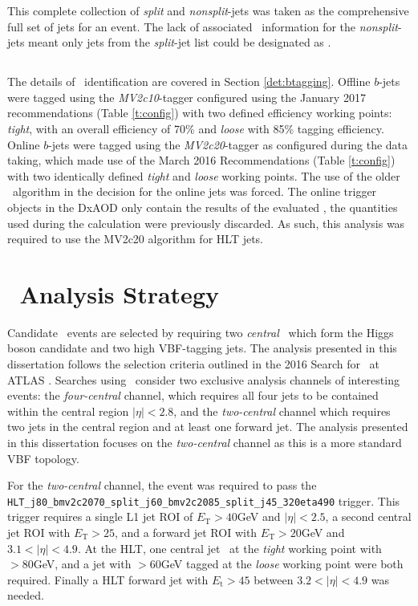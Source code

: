 		This complete collection of \textit{split} and \textit{nonsplit}-jets was taken as the comprehensive full set of jets for an event. The lack of associated \btag\ information for the \textit{nonsplit}-jets meant only jets from the \textit{split}-jet list could be designated as \bjets.

		\subsection{\bjets}

		The details of \bjet\ identification are covered in Section \ref{det:btagging}. Offline $b$-jets were tagged using the \textit{MV2c10}-tagger configured using the January 2017 recommendations (Table \ref{t:config}) with two defined efficiency working points: \textit{tight}, with an overall efficiency of 70\% and \textit{loose} with 85\% tagging efficiency. Online $b$-jets were tagged using the \textit{MV2c20}-tagger as configured during the data taking, which made use of the March 2016 Recommendations (Table \ref{t:config}) with two identically defined \textit{tight} and \textit{loose} working points. The use of the older \btagging\ algorithm in the decision for the online jets was forced. The online trigger objects in the DxAOD only contain the results of the evaluated \btag, the quantities used during the calculation were previously discarded. As such, this analysis was required to use the MV2c20 algorithm for HLT jets.


	\section{\VBFHBB\, Analysis Strategy}


	\label{es:as}
		Candidate \VBFHBB\, events are selected by requiring two \textit{central} \bjets\, which form the Higgs boson candidate and two high \pt VBF-tagging jets. The analysis presented in this dissertation follows the selection criteria outlined in the 2016 Search for \VBFHBB\ at ATLAS \cite{VBFHbb8tev}. Searches using \VBFHBB\, consider two exclusive analysis channels of interesting events: the \textit{four-central} channel, which requires all four jets to be contained within the central region $|\eta| < 2.8$, and the \textit{two-central} channel which requires two jets in the central region and at least one forward jet.
		The analysis presented in this dissertation focuses on the \textit{two-central} channel as this is a more standard VBF topology.

		For the \textit{two-central} channel, the event was required to pass the \texttt{HLT\_j80\_bmv2c2070\_split\_\-j60\_bmv2c2085\_split\_j45\_320eta490} trigger. This trigger requires a single L1 jet ROI of $E_\text{T} > 40$GeV and $|\eta| < 2.5$, a second central jet ROI with $E_\text{T} > 25$, and a forward jet ROI with $E_\text{T} > 20$GeV and $3.1 < |\eta| < 4.9$.
		At the HLT, one central jet \btagged\, at the \textit{tight} working point with \pt $>80$GeV, and a jet with \pt$>60$GeV tagged at the \textit{loose} working point were both required. Finally a HLT forward jet with $E_\text{t}>45$ between $3.2 < |\eta| < 4.9$ was needed.

